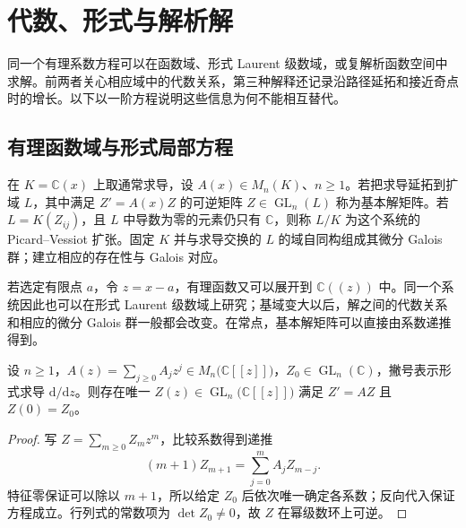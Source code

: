 %
%
\section{代数、形式与解析解}
\label{b5:sec:D02}

同一个有理系数方程可以在函数域、形式 Laurent 级数域，或复解析函数空间中求解。前两者关心相应域中的代数关系，第三种解释还记录沿路径延拓和接近奇点时的增长。以下以一阶方程说明这些信息为何不能相互替代。

\subsection{有理函数域与形式局部方程}
\label{b5:subsec:D02:01}

在 \(K=\mathbb C(x)\) 上取通常求导，设 \(A(x)\in M_n(K)\)、\(n\ge1\)。若把求导延拓到扩域 \(L\)，其中满足 \(Z'=A(x)Z\) 的可逆矩阵 \(Z\in\operatorname{GL}_n(L)\) 称为基本解矩阵。若 \(L=K(Z_{ij})\)，且 \(L\) 中导数为零的元素仍只有 \(\mathbb C\)，则称 \(L/K\) 为这个系统的 Picard--Vessiot 扩张。固定 \(K\) 并与求导交换的 \(L\) 的域自同构组成其微分 Galois 群；建立相应的存在性与 Galois 对应。

\ProseParagraphBreak
若选定有限点 \(a\)，令 \(z=x-a\)，有理函数又可以展开到 \(\mathbb C(\!(z)\!)\) 中。同一个系统因此也可以在形式 Laurent 级数域上研究；基域变大以后，解之间的代数关系和相应的微分 Galois 群一般都会改变。在常点，基本解矩阵可以直接由系数递推得到。

\begin{proposition}\label{b5:prop:D-ordinary-formal-solution}
	设 \(n\ge1\)，\(A(z)=\sum_{j\ge0}A_jz^j\in M_n\bigl(\mathbb C[\![z]\!]\bigr)\)，\(Z_0\in\operatorname{GL}_n(\mathbb C)\)，撇号表示形式求导 \(\mathrm d/\mathrm dz\)。则存在唯一 \(Z(z)\in\operatorname{GL}_n\bigl(\mathbb C[\![z]\!]\bigr)\) 满足 \(Z'=AZ\) 且 \(Z(0)=Z_0\)。
\end{proposition}
\begin{proof}
	写 \(Z=\sum_{m\ge0}Z_mz^m\)，比较系数得到递推
	\[
		(m+1)Z_{m+1}=\sum_{j=0}^m A_jZ_{m-j}.
	\]
	特征零保证可以除以 \(m+1\)，所以给定 \(Z_0\) 后依次唯一确定各系数；反向代入保证方程成立。行列式的常数项为 \(\det Z_0\ne0\)，故 \(Z\) 在幂级数环上可逆。
\end{proof}

